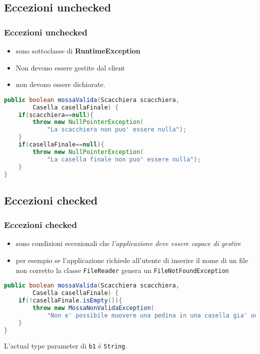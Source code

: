 \documentclass{beamer}
\begin{document}
\subsection{Eccezioni unchecked}
\begin{frame}[fragile]
\frametitle{Eccezioni unchecked}
\begin{itemize}
\item sono sottoclasse di \textbf{RuntimeException}
\item Non devono essere gestite dal client 
\item non devono essere dichiarate.
\end{itemize}
\begin{framed}
\begin{lstlisting}[language=Java]
public boolean mossaValida(Scacchiera scacchiera, 
        Casella casellaFinale) {
    if(scacchiera==null){
        throw new NullPointerException(
            "La scacchiera non puo' essere nulla");
    }
    if(casellaFinale==null){
        throw new NullPointerException(
            "La casella finale non puo' essere nulla");
    }
}
\end{lstlisting}
\end{framed}
\end{frame}




\subsection{Eccezioni checked}
\begin{frame}[fragile]
\frametitle{Eccezioni checked}
\begin{itemize}
\item sono condizioni eccezionali che \emph{l'applicazione deve essere capace di gestire} 
\item  per esempio se l'applicazione richiede all'utente di inserire il nome di un file non corretto la classe \texttt{FileReader} genera un \texttt{FileNotFoundException}
\end{itemize}
\begin{framed}
\begin{lstlisting}[language=Java]
public boolean mossaValida(Scacchiera scacchiera, 
        Casella casellaFinale) {
    if(!casellaFinale.isEmpty()){
        throw new MossaNonValidaException(
            "Non e' possibile muovere una pedina in una casella gia' occupata");
    }
}
\end{lstlisting}
L'actual type parameter di \texttt{b1} \`e \texttt{String}.
\end{framed}
\end{frame}
\end{document}
